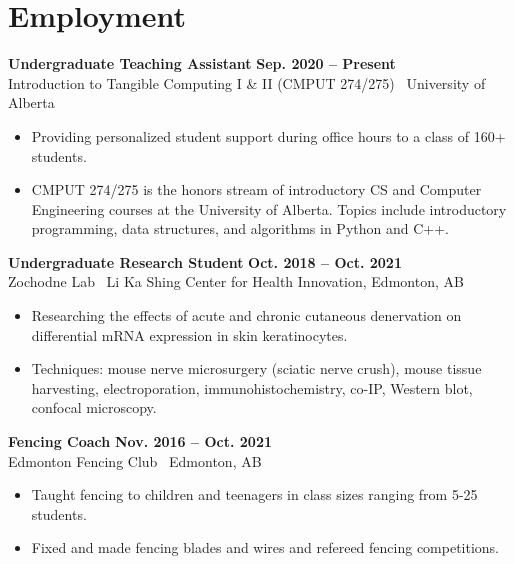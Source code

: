 \documentclass{article}
\begin{document}
\section*{\textcolor{my_colour}{Employment}}
\vspace{-.25em} \hrulefill \vspace{.75em}

\textbf{Undergraduate Teaching Assistant} \hfill \textbf{Sep. 2020 -- Present}\\
Introduction to Tangible Computing I \& II (CMPUT 274/275) \textbar\ University of Alberta
\begin{itemize}
    \item Providing personalized student support during office hours to a class of 160+ students.
    \item CMPUT 274/275 is the honors stream of introductory CS and Computer Engineering courses at the University of Alberta. Topics include introductory programming, data structures, and algorithms in Python and C++.
\end{itemize}

\textbf{Undergraduate Research Student} \hfill \textbf{Oct. 2018 -- Oct. 2021}\\
Zochodne Lab \textbar\ Li Ka Shing Center for Health Innovation, Edmonton, AB
\begin{itemize}
    \item Researching the effects of acute and chronic cutaneous denervation on differential mRNA expression in skin keratinocytes.
    \item Techniques: mouse nerve microsurgery (sciatic nerve crush), mouse tissue harvesting, electroporation, immunohistochemistry, co-IP, Western blot, confocal microscopy.
\end{itemize}

\textbf{Fencing Coach} \hfill \textbf{Nov. 2016 -- Oct. 2021}\\
Edmonton Fencing Club \textbar\ Edmonton, AB
\begin{itemize}
    \item Taught fencing to children and teenagers in class sizes ranging from 5-25 students.
    \item Fixed and made fencing blades and wires and refereed fencing competitions.
\end{itemize}


\end{document}
